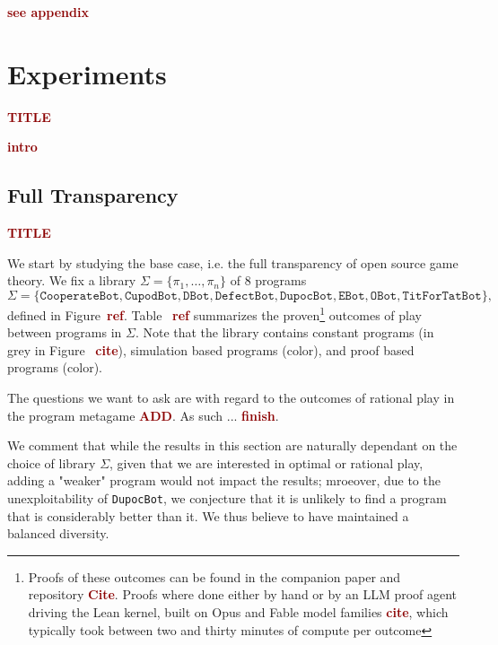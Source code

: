 \documentclass[twoside,11pt]{article}
\newcommand{\boldred}[1]{\textbf{\textcolor{darkred}{#1}}}
\begin{document}
\boldred{see appendix}




\newpage

\section{Experiments}

\boldred{TITLE}

\boldred{intro}

\subsection{Full Transparency}

\boldred{TITLE}

We start by studying the base case, i.e. the full transparency of open source game theory. We fix a library $\Sigma = \{\pi_1, \dots, \pi_n\}$ of $8$ programs
\begin{equation*}
    \Sigma= \{\texttt{CooperateBot}, \texttt{CupodBot}, \texttt{DBot}, \texttt{DefectBot}, \texttt{DupocBot}, \texttt{EBot}, \texttt{OBot}, \texttt{TitForTatBot}\},
\end{equation*}
defined in Figure~\boldred{ref}. Table ~\boldred{ref} summarizes the proven\footnote{Proofs of these outcomes can be found in the companion paper and repository \boldred{Cite}. Proofs where done either by hand or by an LLM proof agent driving the Lean kernel, built on Opus and Fable model families \boldred{cite}, which typically took between two and thirty minutes of compute per outcome } outcomes of play between programs in $\Sigma$. Note that the library contains constant programs (in grey in Figure~ \boldred{cite}), simulation based programs (color), and proof based programs (color). 



The questions we want to ask are with regard to the outcomes of rational play in the program metagame \boldred{ADD}. As such ... \boldred{finish}.

We comment that while the results in this section are naturally dependant on the choice of library $\Sigma$, given that we are interested in optimal or rational play, adding a "weaker" program would not impact the results; mroeover, due to the unexploitability of \texttt{DupocBot}, we conjecture that it is unlikely to find a program that is considerably better than it. We thus believe to have maintained a balanced diversity. 
\end{document}
